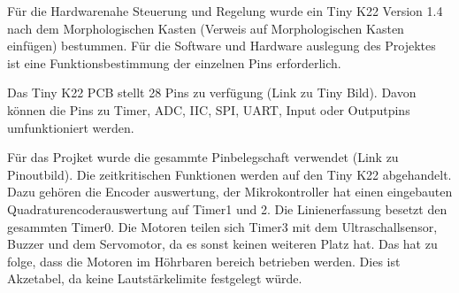 Für die Hardwarenahe Steuerung und Regelung wurde ein Tiny K22 Version 1.4 nach dem Morphologischen Kasten (Verweis auf Morphologischen Kasten einfügen) bestummen. Für die Software und Hardware auslegung des Projektes ist eine Funktionsbestimmung der einzelnen Pins erforderlich.

Das Tiny K22 PCB stellt 28 Pins zu verfügung (Link zu Tiny Bild). Davon können die Pins zu Timer, ADC, IIC, SPI, UART, Input oder Outputpins umfunktioniert werden.

Für das Projket wurde die gesammte Pinbelegschaft verwendet (Link zu Pinoutbild). Die zeitkritischen Funktionen werden auf den Tiny K22 abgehandelt. Dazu gehören die Encoder auswertung, der Mikrokontroller hat einen eingebauten Quadraturencoderauswertung auf Timer1 und 2. Die Linienerfassung besetzt den gesammten Timer0. Die Motoren teilen sich Timer3 mit dem Ultraschallsensor, Buzzer und dem Servomotor, da es sonst keinen weiteren Platz hat. Das hat zu folge, dass die Motoren im Höhrbaren bereich betrieben werden. Dies ist Akzetabel, da keine Lautstärkelimite festgelegt würde.











